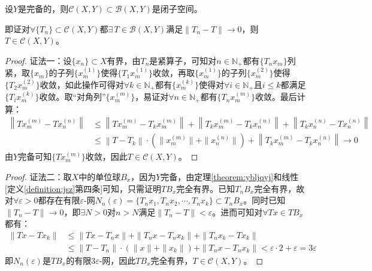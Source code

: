 \begin{theorem}
设$Y$是完备的，则$\mathscr{C}(X,Y) \subset \mathscr{B}(X,Y)$是闭子空间。
\end{theorem}
\begin{remark}
\quad 即证对$\forall \{T_n\} \subset \mathscr{C}(X,Y)$都$\exists \, T \in \mathscr{B}(X,Y)$满足$\|T_n-T\|\to0$，则$T \in \mathscr{C}(X,Y)$。
\end{remark}
\begin{proof}
证法一：设$\{x_n\} \subset X$有界，由$T_n$是紧算子，可知对$n \in \mathbb{N}_+$都有$\{T_nx_m\}$列紧，取$\{x_m\}$的子列$\{x_m^{(1)}\}$使得$\{T_1x_m^{(1)}\}$收敛，再取$\{x_m^{(1)}\}$的子列$\{x_m^{(2)}\}$使得$\{T_2x_m^{(2)}\}$收敛，如此操作可得对$\forall k \in \mathbb{N}_+$都有$\{x_m^{(k)}\}$使得对$\forall i \in \mathbb{N}_+$且$i \leq k$都满足$\{T_ix_m^{(k)}\}$收敛。取“对角列”$\{x_m^{(m)}\}$，易证对$\forall n \in \mathbb{N}_+$都有$\{T_nx_m^{(m)}\}$收敛。最后计算：
\[\begin{aligned}
\left\|Tx_m^{(m)}-Tx_n^{(n)}\right\| &\leq \left\|Tx_m^{(m)}-T_kx_m^{(m)}\right\|+\left\|T_kx_m^{(m)}-T_kx_n^{(n)}\right\|+\left\|T_kx_n^{(n)}-Tx_n^{(n)}\right\|\\
&\leq \left\|T-T_k\right\|\cdot\left(\|x_m^{(m)}\|+\|x_n^{(n)}\|\right)+\left\|T_kx_m^{(m)}-T_kx_n^{(n)}\right\| \to 0
\end{aligned}\]
由$Y$完备可知$\{Tx_m^{(m)}\}$收敛，因此$T \in \mathscr{C}(X,Y)$。
\end{proof}
\begin{proof}
证法二：取$X$中的单位球$B_x$，因为$Y$完备，由定理\ref{theorem:ybljqyj}和线性[定义\ref{definition:jsz}第四条]可知，只需证明$TB_x$完全有界。已知$T_nB_x$完全有界，故对$\forall \varepsilon>0$都存在有限$\varepsilon$-网$N_n(\varepsilon)=\{T_nx_1,T_nx_2,\cdots,T_nx_k\} \subset T_nB_x$。同时已知$\|T_n-T\| \to 0$，即$\exists N>0$对$n >N$满足$\|T_n-T\|<\varepsilon$。进而可知对$\forall Tx \in TB_x$都有：
\[\begin{aligned}
\|Tx-Tx_k\|&\leq\|Tx-T_nx\|+\|T_nx-T_nx_k\|+\|T_nx_k-Tx_k\|\\
&\leq \|T-T_n\|\cdot\left(\|x\|+\|x_k\|\right)+\|T_nx-T_nx_k\|<\varepsilon\cdot2+\varepsilon=3\varepsilon
\end{aligned}\]
即$N_n(\varepsilon)$是$TB_x$的有限$3\varepsilon$-网，因此$TB_x$完全有界，$T \in \mathscr{C}(X,Y)$。
\end{proof}

